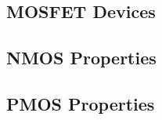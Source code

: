 \documentclass[class=report, 12pt, crop=false]{standalone}
\begin{document}
\begin{center}
\chapter{MOSFET Devices}
\begin{comment}
\end{comment}
\section{NMOS Properties}
\begin{comment}
\end{comment}
\section{PMOS Properties}
\begin{comment}
\end{comment}
\end{center}
\end{document}
